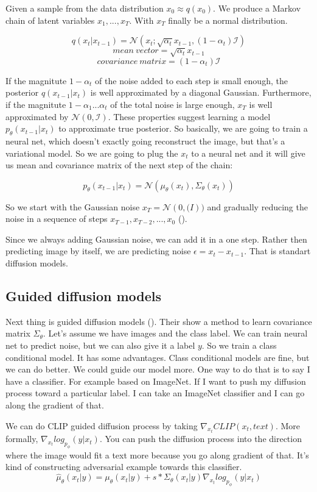 Given a sample from the data distribution $x_0 \approx q(x_0)$. We produce a Markov chain of latent variables $x_1, ..., x_T$.
With $x_T$ finally be a normal distribution.

$$q(x_t|x_{t-1}) = \mathcal{N}(x_t; \sqrt{\alpha_t}x_{t-1}, (1-\alpha_t)\mathcal{I})$$
$$mean~vector = \sqrt{\alpha_t}x_{t-1}$$
$$covariance~matrix=(1-\alpha_t)\mathcal{I}$$

If the magnitute $1-\alpha_t$ of the noise added to each step is small enough,
the posterior $q(x_{t-1}|x_t)$ is well approximated by a diagonal Gaussian.
Furthermore, if the magnitute $1-\alpha_1...\alpha_t$ of the total noise is large enough,
$x_T$ is well approximated by $\mathcal{N}(0, \mathcal{I})$.
These properties suggest learning a model $p_\theta(x_{t-1}|x_t)$ to approximate true posterior.
So basically, we are going to train a neural net, which doesn't exactly going reconstruct the image,
but that's a variational model. So we are going to plug the $x_t$ to a neural net and it will give us mean and covariance matrix of the next step of the chain:

$$p_\theta(x_{t-1}|x_t)=\mathcal{N}(\mu_\theta(x_t), \Sigma_\theta(x_t))$$

So we start with the Gaussian noise $x_T=\mathcal{N}(0, \mathcal(I))$ and gradually reducing the noise in a sequence of steps $x_{T-1}, x_{T-2}, ..., x_0$ (\cite{ho2020denoising}).

Since we always adding Gaussian noise, we can add it in a one step. Rather then predicting image by itself, we are predicting noise $\epsilon=x_{t}-x_{t-1}$.
That is standart diffusion models.

\subsection{Guided diffusion models}
Next thing is guided diffusion models (\cite{nichol2021improved}). Their show a method to learn covariance matrix $\Sigma_\theta$.
Let's assume we have images and the class label. We can train neural net to predict noise, but we can also give it a label $y$.
So we train a class conditional model. It has some advantages. Class conditional models are fine, but we can do better. We could guide our model more.
One way to do that is to say I have a classifier. For example based on ImageNet. If I want to push my diffusion process toward a particular label.
I can take an ImageNet classifier and I can go along the gradient of that.

We can do CLIP guided diffusion process by taking $\nabla_{x_t} CLIP(x_t, text)$.
More formally, $\nabla_{x_t} log_{p_\phi}(y|x_t)$. You can push the diffusion process into the direction where the image would fit a text more because you go along gradient of that.
It's kind of constructing adversarial example towards this classifier.
$$\hat{\mu}_\theta(x_t|y)=\mu_\theta(x_t|y) + s * \Sigma_\theta(x_t|y) \nabla_{x_t}log_{p_\phi}(y|x_t)$$


